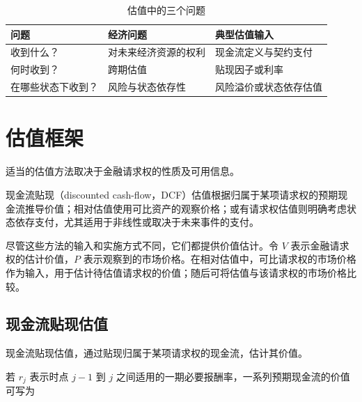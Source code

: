 \begin{table}[H]

\centering

\caption{估值中的三个问题}
\label{tab:ch5-three-valuation-questions}

\begin{tabularx}{\textwidth}{
  @{}
  >{\raggedright\arraybackslash{}}p{3.3cm}
  Y
  Y
  @{}
}

\toprule

\textbf{问题}
& \textbf{经济问题}
& \textbf{典型估值输入} \\

\midrule

收到什么？
& 对未来经济资源的权利
& 现金流定义与契约支付 \\[20pt]

何时收到？
& 跨期估值
& 贴现因子或利率 \\[20pt]

在哪些状态下收到？
& 风险与状态依存性
& 风险溢价或状态依存估值 \\

\bottomrule

\end{tabularx}

\end{table}


\section{估值框架}

适当的估值方法取决于金融请求权的性质及可用信息。

现金流贴现（discounted cash-flow，DCF）估值根据归属于某项请求权的预期现金流推导价值；相对估值使用可比资产的观察价格；或有请求权估值则明确考虑状态依存支付，尤其适用于非线性或取决于未来事件的支付。

尽管这些方法的输入和实施方式不同，它们都提供价值估计。令 $V$ 表示金融请求权的估计价值，$P$ 表示观察到的市场价格。在相对估值中，可比请求权的市场价格作为输入，用于估计待估值请求权的价值；随后可将估值与该请求权的市场价格比较。

\subsection{现金流贴现估值}

现金流贴现估值，通过贴现归属于某项请求权的现金流，估计其价值。

若 $r_j$ 表示时点 $j-1$ 到 $j$ 之间适用的一期必要报酬率，一系列预期现金流的价值可写为

